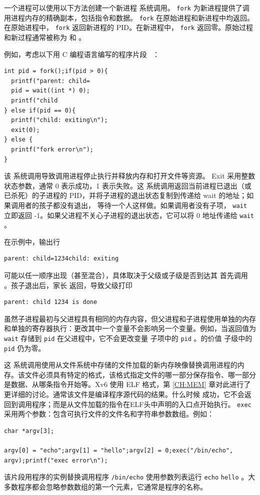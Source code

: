 \documentclass[UTF8]{article}
\begin{document}
一个进程可以使用以下方法创建一个新进程
        系统调用。
    \lstinline{fork}    为新进程提供了调用进程内存的精确副本，包括指令和数据。
    \lstinline{fork}    在原始进程和新进程中均返回。在原始进程中，   \lstinline{fork}    返回新进程的 PID。在新进程中，   \lstinline{fork}    返回零。原始过程和新过程通常被称为
        和
        。  

例如，考虑以下用 C 编程语言编写的程序片段~    \cite{kernighan}    ：
    \begin{lstlisting}[]int pid = fork();if(pid > 0){
  printf("parent: child=
  pid = wait((int *) 0);
  printf("child 
} else if(pid == 0){
  printf("child: exiting\n");
  exit(0);
} else {
  printf("fork error\n");
}
\end{lstlisting}    该
        系统调用导致调用进程停止执行并释放内存和打开文件等资源。 Exit 采用整数状态参数，通常 0 表示成功，1 表示失败。这
        系统调用返回当前进程已退出（或已杀死）的子进程的 PID，并将子进程的退出状态复制到传递给 wait 的地址；如果调用者的孩子都没有退出，
        等待一个人这样做。如果调用者没有子项，   \lstinline{wait}    立即返回 -1。如果父进程不关心子进程的退出状态，它可以将 0 地址传递给
    \lstinline{wait}    。  

在示例中，输出行
    \begin{lstlisting}[]parent: child=1234child: exiting
\end{lstlisting}    可能以任一顺序出现（甚至混合），具体取决于父级或子级是否到达其
 首先调用       。孩子退出后，家长
        返回，导致父级打印
    \begin{lstlisting}[]parent: child 1234 is done
\end{lstlisting}    虽然子进程最初与父进程具有相同的内存内容，但父进程和子进程使用单独的内存和单独的寄存器执行：更改其中一个变量不会影响另一个变量。例如，当返回值为
    \lstinline{wait}    存储到
    \lstinline{pid}    在父进程中，它不会更改变量
 子项中的    \lstinline{pid}   。的价值
 子级中的    \lstinline{pid}    仍为零。  

这
        系统调用使用从文件系统中存储的文件加载的新内存映像替换调用进程的内存。该文件必须具有特定的格式，该格式指定文件的哪一部分保存指令、哪一部分是数据、从哪条指令开始等。Xv6 使用 ELF 格式，第    \ref{CH:MEM}    章对此进行了更详细的讨论。通常该文件是编译程序源代码的结果。什么时候
       成功，它不会返回到调用程序；而是从文件加载的指令在ELF头中声明的入口点开始执行。
    \lstinline{exec}    采用两个参数：包含可执行文件的文件名和字符串参数数组。例如：
    \begin{lstlisting}[]char *argv[3];

argv[0] = "echo";argv[1] = "hello";argv[2] = 0;exec("/bin/echo", argv);printf("exec error\n");
\end{lstlisting}    该片段用程序的实例替换调用程序
    \lstinline{/bin/echo}    使用参数列表运行
    \lstinline{echo}   
    \lstinline{hello}   。大多数程序都会忽略参数数组的第一个元素，它通常是程序的名称。  
\end{document}
